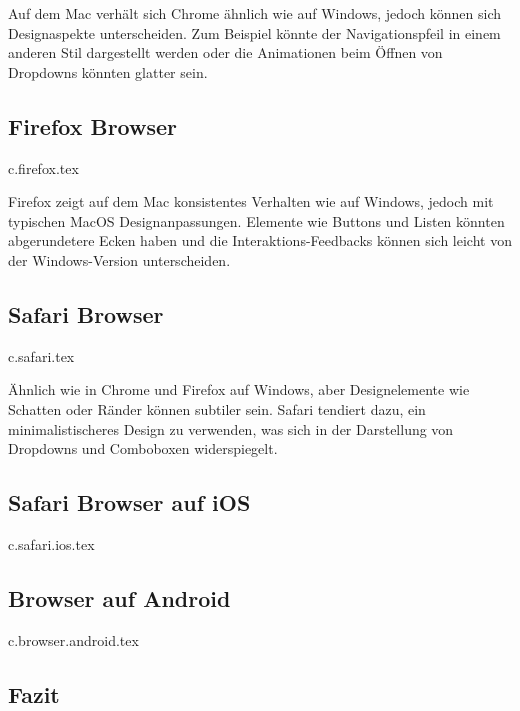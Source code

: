 Auf dem Mac verhält sich Chrome ähnlich wie auf Windows, jedoch können sich Designaspekte unterscheiden. 
Zum Beispiel könnte der Navigationspfeil in einem anderen Stil dargestellt werden oder 
die Animationen beim Öffnen von Dropdowns könnten glatter sein.

\clearpage
\subsection{Firefox Browser}
{c.firefox.tex}

Firefox zeigt auf dem Mac konsistentes Verhalten wie auf Windows, jedoch mit typischen MacOS Designanpassungen. 
Elemente wie Buttons und Listen könnten abgerundetere Ecken haben und 
die Interaktions-Feedbacks können sich leicht von der Windows-Version unterscheiden.

\clearpage
\subsection{Safari Browser}
{c.safari.tex}

Ähnlich wie in Chrome und Firefox auf Windows, aber Designelemente wie Schatten oder Ränder können subtiler sein. 
Safari tendiert dazu, ein minimalistischeres Design zu verwenden, was sich in der Darstellung von Dropdowns und Comboboxen widerspiegelt.

\clearpage
\subsection{Safari Browser auf iOS}
{c.safari.ios.tex}


\clearpage
\subsection{Browser auf Android}
{c.browser.android.tex}


\clearpage
\subsection{Fazit}

